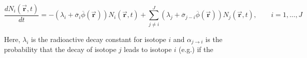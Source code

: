\documentclass[11pt]{report} %
\begin{document}
\begin{equation}
  \frac{d N_i(\vec{\mathbf{r}},t)}{dt} = 
  - (\lambda_i + \overline{\sigma}_i \overline{\phi}(\vec{\mathbf{r}})) N_i(\vec{\mathbf{r}},t) +
  \sum_{j \ne i}^{J} (\lambda_j + \overline{\sigma}_{j-i} \overline{\phi}(\vec{\mathbf{r}})) N_j(\vec{\mathbf{r}},t),
  \qquad i=1,...,J
\end{equation}

Here, $\lambda_i$ is the radioactive decay constant for isotope $i$ and $\alpha_{j \rightarrow i}$ is the probability that the decay of isotope $j$ leads to isotope $i$ (e.g.) if the
\end{document}
